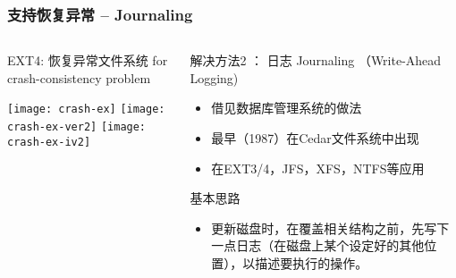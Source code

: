 \begin{frame}[fragile]
	\frametitle{支持恢复异常 -- Journaling}
	\begin{columns}
		\begin{column}{.4\textwidth}
			EXT4: 恢复异常文件系统 for crash-consistency problem
			
			\centering
			\texttt{[image: crash-ex]}
			\texttt{[image: crash-ex-ver2]}
			\texttt{[image: crash-ex-iv2]}	
		\end{column}
		\begin{column}{.6\textwidth}			
			解决方法2 ： 日志 Journaling （Write-Ahead Logging)
			\begin{itemize}
				\item 借见数据库管理系统的做法
				\item 最早（1987）在Cedar文件系统中出现
				\item 在EXT3/4，JFS，XFS，NTFS等应用
			\end{itemize}
			\pause
			基本思路
			\begin{itemize}	
				\item 更新磁盘时，在覆盖相关结构之前，先写下一点日志（在磁盘上某个设定好的其他位置），以{\color{blue}描述要执行的操作}。
			\end{itemize}

		\end{column}
	\end{columns}
	
\end{frame}



